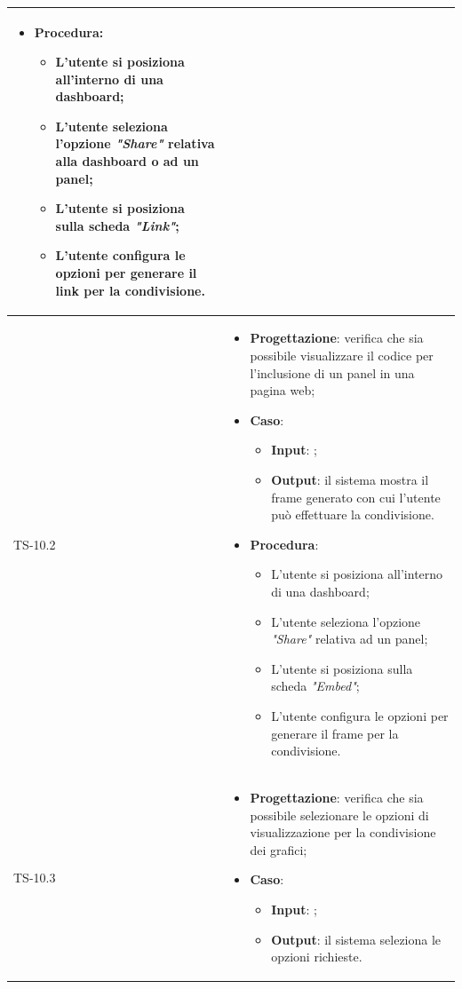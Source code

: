\begin{longtable}{|C{2.5cm}|C{13cm}|}
\begin{itemize}
\begin{itemize}
	\end{itemize}
	\item \textbf{Procedura}:
	\begin{itemize}
		\item L'utente si posiziona all'interno di una dashboard;
		\item L'utente seleziona l'opzione \emph{"Share"} relativa alla dashboard o ad un panel;
		\item L'utente si posiziona sulla scheda \emph{"Link"};
		\item L'utente configura le opzioni per generare il link per la condivisione.
	\end{itemize} 
\end{itemize}
	 \\
	\hline
	{TS-10.2} &
\begin{itemize}
	\item \textbf{Progettazione}: verifica che sia  possibile visualizzare il
	codice per l’inclusione di un panel in una pagina web;
	\item \textbf{Caso}: 
	\begin{itemize}
		\item \textbf{Input}: ;
		\item \textbf{Output}: il sistema mostra il frame generato con cui l'utente può effettuare la condivisione.
	\end{itemize}
	\item \textbf{Procedura}:
	\begin{itemize}
		\item L'utente si posiziona all'interno di una dashboard;
		\item L'utente seleziona l'opzione \emph{"Share"} relativa ad un panel;
		\item L'utente si posiziona sulla scheda \emph{"Embed"};
		\item L'utente configura le opzioni per generare il frame per la condivisione.
	\end{itemize} 
\end{itemize}
	  \\
	\hline
	{TS-10.3} &
\begin{itemize}
	\item \textbf{Progettazione}: verifica che sia possibile selezionare le
	opzioni di visualizzazione per la condivisione dei grafici;
	\item \textbf{Caso}: 
	\begin{itemize}
		\item \textbf{Input}: ;
		\item \textbf{Output}: il sistema seleziona le opzioni richieste.

\end{itemize}
\end{itemize}
\end{longtable}
